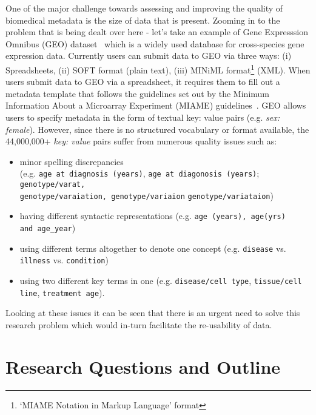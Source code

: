  One of the major challenge towards assessing and improving  the quality of biomedical metadata is the size of data that is present.  Zooming in to the problem that is being dealt over here - let's take an example of Gene Expresssion Omnibus (GEO) dataset~\cite{edgar2002gene} which is a widely used database for cross-species gene expression data. Currently users can submit data to GEO via three ways: (i) Spreadsheets, (ii) SOFT format (plain text), (iii) MINiML format\footnote{`MIAME Notation in Markup Language' format} (XML).
When users submit data to GEO via a spreadsheet, it requires them to fill out a metadata template that follows the guidelines set out by the Minimum Information About a Microarray Experiment (MIAME) guidelines~\cite{brazma2001minimum}. GEO allows users to specify metadata in the form of textual key: value pairs (e.g. \emph{sex: female}). However, since there is no structured vocabulary or format available, the 44,000,000+ \emph{key: value} pairs suffer from numerous quality issues such as:
\begin{itemize}
\item minor spelling discrepancies\\ (e.g. \verb|age at diagnosis (years)|, \verb|age at diagonosis (years)|; 
\verb|genotype/varat,|\\ \verb|genotype/varaiation, genotype/variaion| \verb|genotype/variataion|)
\item having different syntactic representations (e.g. \verb|age (years), age(yrs)|\\ \verb|and age_year|)
\item using different terms altogether to denote one concept (e.g. \verb|disease| vs. \verb|illness| vs. \verb|condition|)
\item using two different key terms in one (e.g. \verb|disease/cell type|, \verb|tissue/cell line|, \verb|treatment age|).
\end{itemize} 
Looking at these issues it can be seen that there is an urgent need to solve this research problem which would in-turn facilitate the re-usability of data. 

\section{Research Questions and Outline}

